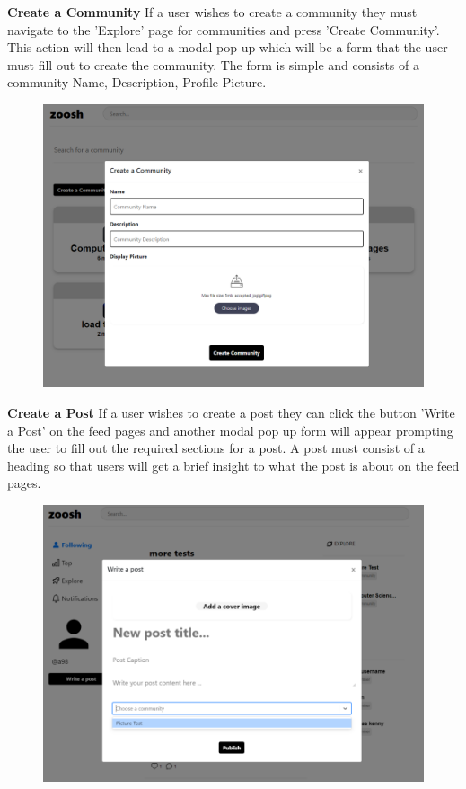 \textbf{Create a Community}
\newline
If a user wishes to create a community they must navigate to the 'Explore' page for communities and press 'Create Community'. This action will then lead to a modal pop up which will be a form that the user must fill out to create the community. The form is simple and consists of a community Name, Description, Profile Picture.

\begin{figure}[H]
  \centering
  \includegraphics[scale=0.35]{img/createcommunity.PNG}
  \label{fig:Create Community Modal Form.}
\end{figure}

\textbf{Create a Post}
\newline
If a user wishes to create a post they can click the button 'Write a Post' on the feed pages and another modal pop up form will appear prompting the user to fill out the required sections for a post. A post must consist of a heading so that users will get a brief insight to what the post is about on the feed pages. 

\begin{figure}[H]
  \centering
  \includegraphics[scale=0.35]{img/createpost.PNG}
  \label{fig:Create Post Modal.}
\end{figure}


